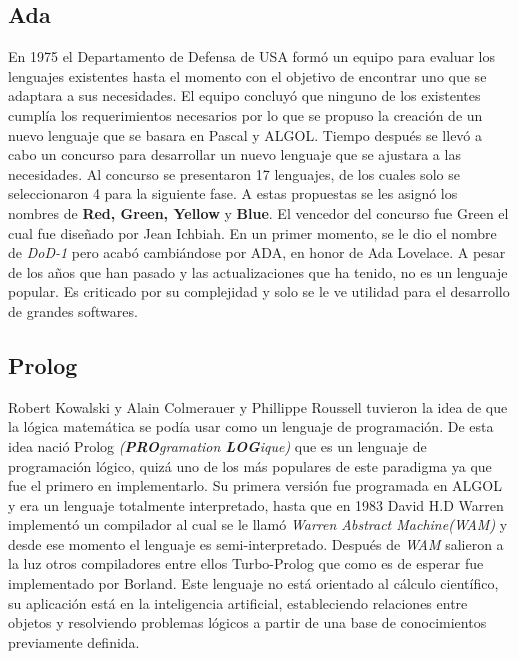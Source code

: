 \documentclass[twoside,twocolumn]{article}
\begin{document}
\subsection{Ada}

En 1975 el Departamento de Defensa de USA formó un equipo para evaluar los lenguajes existentes hasta el momento con el objetivo de encontrar uno que se adaptara a sus necesidades. El equipo concluyó que ninguno de los existentes cumplía los requerimientos necesarios por lo que se propuso la creación de un nuevo lenguaje que se basara en Pascal y ALGOL. Tiempo después se llevó a cabo un concurso para desarrollar un nuevo lenguaje que se ajustara a las necesidades. Al concurso se presentaron 17 lenguajes, de los cuales solo se seleccionaron 4 para la siguiente fase. A estas propuestas se les asignó los nombres de \textbf{Red, Green, Yellow} y \textbf{Blue}. El vencedor del concurso fue Green el cual fue diseñado por Jean Ichbiah. En un primer momento, se le dio el nombre de \textit{DoD-1} pero acabó cambiándose por ADA, en honor de Ada Lovelace. A pesar de los años que han pasado y las actualizaciones que ha tenido, no es un lenguaje popular. Es criticado por su complejidad y solo se le ve utilidad para el desarrollo de grandes softwares.

\subsection{Prolog}

Robert Kowalski y Alain Colmerauer y Phillippe Roussell tuvieron la idea de que la lógica matemática se podía usar como un lenguaje de programación. De esta idea nació Prolog \textit{(\textbf{PRO}gramation \textbf{LOG}ique)} que es un lenguaje de programación lógico, quizá uno de los más populares de este paradigma ya que fue el primero en implementarlo. Su primera versión fue programada en ALGOL y era un lenguaje totalmente interpretado, hasta que en 1983 David H.D Warren implementó un compilador al cual se le llamó \textit{Warren Abstract Machine(WAM)} y desde ese momento el lenguaje es semi-interpretado. Después de \textit{WAM} salieron a la luz otros compiladores entre ellos Turbo-Prolog que como es de esperar fue implementado por Borland. Este lenguaje no está orientado al cálculo científico, su aplicación está en la inteligencia artificial, estableciendo relaciones entre objetos y resolviendo problemas lógicos a partir de una base de conocimientos previamente definida.
\end{document}
